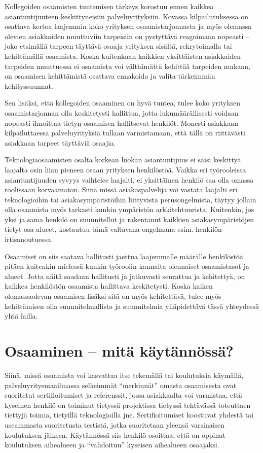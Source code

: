 \documentclass[a4paper,finnish,12pt]{article}
\begin{document}
Kollegoiden osaamisten tuntemisen tärkeys korostuu ennen kaikkea asiantuntijuuteen keskittyneisiin palveluyrityksiin. Kovassa kilpailutuksessa on osattava kertoa laajemmin koko yrityksen osaamistarjonnasta ja myös olemassa olevien asiakkaiden muuttuviin tarpeisiin on pystyttävä reagoimaan nopeasti -- joko etsimällä tarpeen täyttävä osaaja yrityksen sisältä, rekrytoimalla tai kehittämällä osaamista. Koska kuitenkaan kaikkien yksittäisten asiakkaiden tarpeiden muuttuessa ei osaamista voi välttämättä kehittää tarpeiden mukaan, on osaamisen kehittämistä osattava ennakoida ja valita tärkeimmän kehityssuunnat.

Sen lisäksi, että kollegoiden osaaminen on hyvä tuntea, tulee koko yrityksen osaamistarjonnan olla keskitetysti hallittua, jotta lukumäärällisesti voidaan nopeasti ilmoittaa tietyn osaamisen hallitsevat henkilöt. Monesti asiakkaan kilpailuttaessa palveluyrityksiä tullaan varmistamaan, että tällä on riittävästi asiakkaan tarpeet täyttäviä osaajia.

Teknologiaosaamisten osalta korkean luokan asiantuntijuus ei saisi keskittyä laajalta osin liian pieneen osaan yrityksen henkilöstöä. Vaikka eri työrooleissa asiantuntijuuden syvyys vaihtelee laajalti, ei yksittäinen henkilö saa olla omassa roolissaan korvaamaton. Siinä missä asiakaspalvelija voi vastata laajalti eri teknologioihin tai asiakasympäristöihin liittyvistä perusongelmista, täytyy jollain olla osaamista myös tarkasti kunkin ympäristön arkkitehtuurista. Kuitenkin, jos yksi ja sama henkilö on suunnitellut ja rakentanut kaikkien asiakasympäristöjen tietyt osa-alueet, kostautuu tämä valtavana ongelmana esim. henkilön irtisanoutuessa.

Osaamiset on siis saatava hallitusti jaettua laajemmalle määrälle henkilöstöä pitäen kuitenkin mielessä kunkin työroolin kannalta olennaiset osaamistasot ja alueet. Jotta näitä saadaan hallitusti ja jatkuvasti seurattua ja kehitettyä, on kaikkea henkilöstön osaamista hallittava keskitetysti. Koska kaiken olemassaolevan osaamisen lisäksi sitä on myös kehitettävä, tulee myös kehittämisen olla suunnitelmallista ja suunnitelmia ylläpidettävä tässä yhteydessä yhtä lailla.

\pagebreak

\section{Osaaminen -- mitä käytännössä?}

Siinä, missä osaamista voi kasvattaa itse tekemällä tai koulutuksia käymällä, palveluyritysmaailmassa selkeimmät ``merkinnät'' omasta osaamisesta ovat suoritetut sertifioitumiset ja referenssit, jossa asiakkaalta voi varmistaa, että kyseinen henkilö on toiminut tietyssä projektissa tietyssä tehtävässä toteuttaen tiettyjä toimia, tietyillä teknologioilla jne. Sertifioitumiset koostuvat yhdestä tai useammasta suoritetusta testistä, jotka suoritetaan yleensä varsinaisen koulutuksen jälkeen. Käytännössä siis henkilö osoittaa, että on oppinut koulutuksen aihealueen ja ``validoituu'' kyseisen aihealueen osaajaksi.
\end{document}
